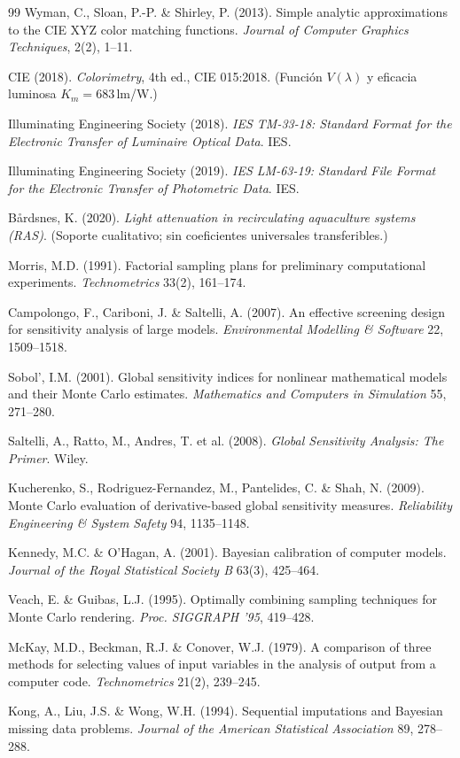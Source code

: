 \documentclass[11pt,a4paper]{article}
\begin{document}
\begin{thebibliography}{99}
 Wyman, C., Sloan, P.-P. \& Shirley, P. (2013). Simple analytic
approximations to the CIE XYZ color matching functions. \emph{Journal of Computer
Graphics Techniques}, 2(2), 1--11.

 CIE (2018). \emph{Colorimetry}, 4th ed., CIE 015:2018. (Función
$V(\lambda)$ y eficacia luminosa $K_m=683\,$lm/W.)

 Illuminating Engineering Society (2018). \emph{IES TM-33-18:
Standard Format for the Electronic Transfer of Luminaire Optical Data}. IES.

 Illuminating Engineering Society (2019). \emph{IES LM-63-19:
Standard File Format for the Electronic Transfer of Photometric Data}. IES.

 Bårdsnes, K. (2020). \emph{Light attenuation in
recirculating aquaculture systems (RAS)}. (Soporte cualitativo; sin coeficientes
universales transferibles.)


 Morris, M.D. (1991). Factorial sampling plans for preliminary
computational experiments. \emph{Technometrics} 33(2), 161--174.

 Campolongo, F., Cariboni, J. \& Saltelli, A. (2007). An
effective screening design for sensitivity analysis of large models.
\emph{Environmental Modelling \& Software} 22, 1509--1518.

 Sobol', I.M. (2001). Global sensitivity indices for nonlinear
mathematical models and their Monte Carlo estimates. \emph{Mathematics and Computers
in Simulation} 55, 271--280.

 Saltelli, A., Ratto, M., Andres, T. et al. (2008).
\emph{Global Sensitivity Analysis: The Primer}. Wiley.

 Kucherenko, S., Rodriguez-Fernandez, M., Pantelides, C. \&
Shah, N. (2009). Monte Carlo evaluation of derivative-based global sensitivity
measures. \emph{Reliability Engineering \& System Safety} 94, 1135--1148.

 Kennedy, M.C. \& O'Hagan, A. (2001). Bayesian calibration of
computer models. \emph{Journal of the Royal Statistical Society B} 63(3), 425--464.

 Veach, E. \& Guibas, L.J. (1995). Optimally combining sampling
techniques for Monte Carlo rendering. \emph{Proc. SIGGRAPH '95}, 419--428.

 McKay, M.D., Beckman, R.J. \& Conover, W.J. (1979). A comparison
of three methods for selecting values of input variables in the analysis of output
from a computer code. \emph{Technometrics} 21(2), 239--245.

 Kong, A., Liu, J.S. \& Wong, W.H. (1994). Sequential imputations
and Bayesian missing data problems. \emph{Journal of the American Statistical
Association} 89, 278--288.

\end{thebibliography}
\end{document}
